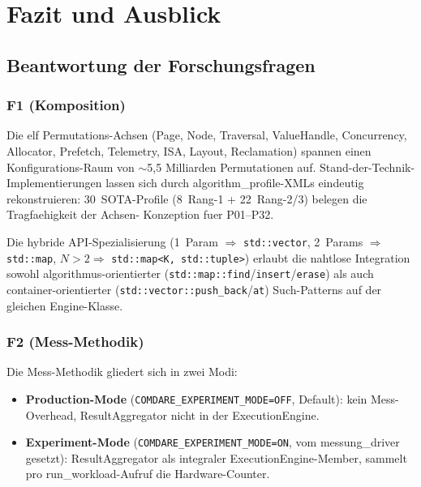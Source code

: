 \chapter{Fazit und Ausblick}\label{ch:fazit}


\section{Beantwortung der Forschungsfragen}

\subsection*{F1 (Komposition)}

Die elf Permutations-Achsen (Page, Node, Traversal, ValueHandle,
Concurrency, Allocator, Prefetch, Telemetry, ISA, Layout, Reclamation)
spannen einen Konfigurations-Raum von $\sim$5,5 Milliarden Permutationen
auf. Stand-der-Technik-Implementierungen lassen sich durch
algorithm\_profile-XMLs eindeutig rekonstruieren: 30~SOTA-Profile
(8~Rang-1 + 22~Rang-2/3) belegen die Tragfaehigkeit der Achsen-
Konzeption fuer P01--P32.

Die hybride API-Spezialisierung (1~Param $\Rightarrow$
\texttt{std::vector}, 2~Params $\Rightarrow$ \texttt{std::map},
$N>2 \Rightarrow$ \texttt{std::map<K, std::tuple>}) erlaubt die
nahtlose Integration sowohl algorithmus-orientierter
(\texttt{std::map::find}/\texttt{insert}/\texttt{erase}) als auch
container-orientierter (\texttt{std::vector::push\_back}/\texttt{at})
Such-Patterns auf der gleichen Engine-Klasse.

\subsection*{F2 (Mess-Methodik)}

Die Mess-Methodik gliedert sich in zwei Modi:

\begin{itemize}
    \item \textbf{Production-Mode} (\texttt{COMDARE\_EXPERIMENT\_MODE=OFF},
          Default): kein Mess-Overhead, ResultAggregator nicht in der
          ExecutionEngine.
    \item \textbf{Experiment-Mode} (\texttt{COMDARE\_EXPERIMENT\_MODE=ON},
          vom messung\_driver gesetzt): ResultAggregator als
          integraler ExecutionEngine-Member, sammelt pro
          run\_workload-Aufruf die Hardware-Counter.
\end{itemize}

